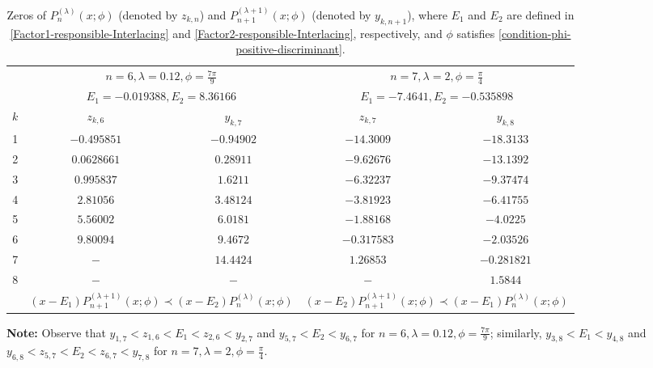 \documentclass[final,3p,times,12pt]{elsarticle}
\numberwithin{equation}{section}  %
\begin{document}
	
	\begin{table}[ht]
		\centering
		\caption{Zeros of $P_{n}^{(\lambda)}(x;\phi)$ (denoted by $z_{k,n}$) and $P_{n+1}^{(\lambda+1)}(x;\phi)$ (denoted by $y_{k,n+1}$), where $E_1$ and $E_2$ are defined in  \eqref{Factor1-responsible-Interlacing} and \eqref{Factor2-responsible-Interlacing}, respectively, and $\phi$ satisfies \eqref{condition-phi-positive-discriminant}. }
		\label{tab2:Interlacingzeros1_MeixnerPoll}
		\footnotesize 
		\setlength{\tabcolsep}{12pt} 
		\begin{tabular}{@{}c cc | cc@{}}
			\toprule
			
			\addlinespace[2pt]
			& \multicolumn{2}{c|}{$n=6, \lambda=0.12, \phi=\frac{7\pi}{9}$} & \multicolumn{2}{c}{$n=7, \lambda=2, \phi=\frac{\pi}{4}$} \\
			& \multicolumn{2}{c|}{$E_1 = -0.019388, E_2=8.36166$} & \multicolumn{2}{c}{$E_1=-7.4641, E_2=-0.535898$} \\
			\midrule
			$k$ & $z_{k,6}$ & $y_{k,7}$ & $z_{k,7}$ & $y_{k,8}$ \\
			\midrule
			
			1 & $-0.495851$ & $-0.94902$ & $-14.3009$ & $-18.3133$ \\
			2 & $0.0628661$ & $0.28911$ & $-9.62676$ & $-13.1392$ \\
			3 & $0.995837$ & $1.6211$ & $-6.32237$ & $-9.37474$ \\
			4 & $2.81056$ & $3.48124$ & $-3.81923$ & $-6.41755$ \\
			5 & $5.56002$ & $6.0181$ & $-1.88168$ & $-4.0225$ \\
			6 & $9.80094$ & $9.4672$ & $-0.317583$ & $-2.03526$ \\
			7 & $-$ & $14.4424$ & $1.26853$ & $-0.281821$ \\
			8 & $-$ & $-$ & $-$ & $1.5844$ \\
			\midrule
			& \multicolumn{2}{c|}{$(x-E_1)P_{n+1}^{(\lambda+1)}(x;\phi)\prec (x-E_2) P_{n}^{(\lambda)}(x;\phi)$} & \multicolumn{2}{c}{$(x-E_2)P_{n+1}^{(\lambda+1)}(x;\phi)\prec (x-E_1) P_{n}^{(\lambda)}(x;\phi)$} \\
			\bottomrule
			
		\end{tabular}
		
		\vspace{0.2cm}
		\begin{minipage}{0.9\textwidth}
			\footnotesize
			\textbf{Note:} Observe that $y_{1,7}<z_{1,6}<E_1 < z_{2,6}<y_{2,7}$ and $y_{5,7}<E_2 < y_{6,7}$ for $n=6, \lambda=0.12, \phi=\frac{7\pi}{9}$; similarly, $y_{3,8}<E_1<y_{4,8}$ and $y_{6,8}<z_{5,7}<E_2 < z_{6,7}<y_{7,8}$ for $n=7, \lambda=2, \phi=\frac{\pi}{4}$.
		\end{minipage}
	\end{table}	
\end{document}
